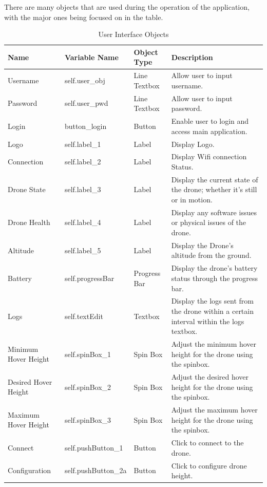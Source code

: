 \documentclass[12pt, titlepage]{article}
\begin{document}
There are many objects that are used during the operation of the application, with the major ones being focused on in the  table.

\begin{table}[!h]
\begin{center}
\caption {User Interface Objects}
\label{tab:UserInterfaceObjects}
\begin{tabular}{ | m{2.5cm} | m{3.5cm} | m{2.5cm} | m{6.5cm} | } 
\hline
Name & Variable Name & Object Type & Description \\
\hline
Username & self.user_obj &  Line Textbox & Allow user to input username. \\
\hline
Password & self.user_pwd & Line Textbox & Allow user to input password. \\
\hline
Login & button_login & Button & Enable user to login and access main application. \\
\hline
Logo & self.label_1 & Label & Display Logo. \\
\hline
Connection & self.label_2 & Label & Display Wifi connection Status. \\
\hline
Drone State & self.label_3 & Label & Display the current state of the drone; whether it’s still or in motion. \\
\hline
Drone Health & self.label_4 & Label & Display any software issues or physical issues of the drone. \\
\hline
Altitude & self.label_5 & Label & Display the Drone’s altitude from the ground. \\
\hline
Battery & self.progressBar & Progress Bar & Display the drone's battery status through the progress bar. \\
\hline
Logs & self.textEdit & Textbox & Display the logs sent from the drone within a certain interval within the logs textbox. \\
\hline
Minimum Hover Height & self.spinBox_1 & Spin Box & Adjust the minimum hover height for the drone using the spinbox. \\
\hline
Desired Hover Height & self.spinBox_2 & Spin Box & Adjust the desired hover height for the drone using the spinbox. \\
\hline
Maximum Hover Height & self.spinBox_3 & Spin Box & Adjust the maximum hover height for the drone using the spinbox. \\
\hline
Connect & self.pushButton_1 & Button & Click to connect to the drone. \\
\hline
Configuration & self.pushButton_2a & Button & Click to configure drone height. \\

\end{tabular}
\end{center}
\end{table}
\end{document}

